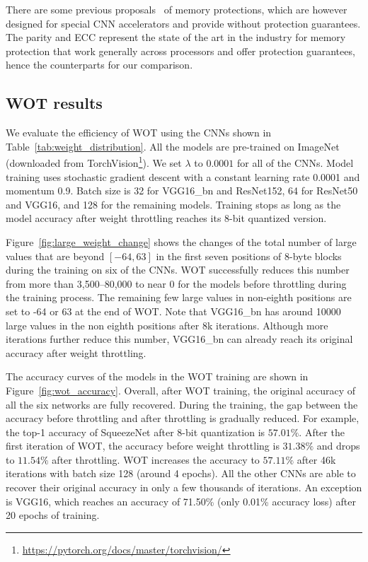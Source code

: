 \documentclass{article}
\newcommand{\TODO}[1]{{\it \color{blue}\{TODO: #1\}}}
\begin{document}
There are some previous proposals~\cite{reagen2016minerva, azizimazreah2018tolerating} of memory protections, which are however designed for special CNN accelerators and provide without protection guarantees. The parity and ECC represent the state of the art in the industry for memory protection that work generally across processors and offer protection guarantees, hence the counterparts for our comparison.



\subsection{WOT results}
\label{sec:wot_results} 

We evaluate the efficiency of WOT using the CNNs shown in Table~\ref{tab:weight_distribution}. All the models are pre-trained on ImageNet (downloaded from TorchVision\footnote{\url{https://pytorch.org/docs/master/torchvision/}}). We set $\lambda$ to $0.0001$ for all of the CNNs. Model training uses stochastic gradient descent with a constant learning rate 0.0001 and momentum 0.9. Batch size is 32 for VGG16\_bn and ResNet152, 64 for ResNet50 and VGG16, and 128 for the remaining models. Training stops as long as the model accuracy after weight throttling reaches its 8-bit quantized version. 

Figure~\ref{fig:large_weight_change} shows the changes of the total number of large values that are beyond $[-64, 63]$ in the first seven positions of 8-byte blocks during the training on six of the CNNs. WOT successfully reduces this number from more than 3,500--80,000 to near 0 for the models before throttling during the training process. The remaining few large values in non-eighth positions are set to -64 or 63 at the end of WOT. Note that VGG16\_bn has around 10000 large values in the non eighth positions after 8k iterations. Although more iterations further reduce this number, VGG16\_bn can already reach its original accuracy after weight throttling. 


The accuracy curves of the models in the WOT training are shown in Figure~\ref{fig:wot_accuracy}. Overall, after WOT training, the original accuracy of all the six networks are fully recovered. During the training, the gap between the accuracy before throttling and after throttling is gradually reduced. For example, the top-1 accuracy of SqueezeNet after 8-bit quantization is $57.01\%$. After the first iteration of WOT, the accuracy before weight throttling is $31.38\%$ and drops to $11.54\%$ after throttling. WOT increases the accuracy to  $57.11\%$ after 46k iterations with batch size 128 (around 4 epochs). All the other CNNs are able to recover their original accuracy in only a few thousands of iterations. An exception is VGG16, which reaches an accuracy of 71.50\% (only 0.01\% accuracy loss) after 20 epochs of training.   
\end{document}
